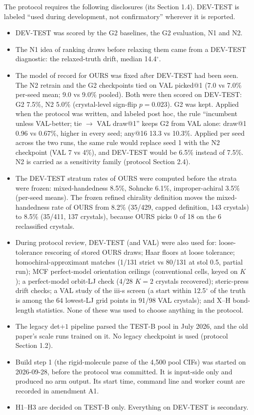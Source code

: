 The protocol requires the following disclosures (its Section 1.4). DEV-TEST is
labeled ``used during development, not confirmatory'' wherever it is reported.
\begin{itemize}
\item[(a)] DEV-TEST was scored by the G2 baselines, the G2 evaluation, N1 and N2.
\item[(b)] The N1 idea of ranking draws before relaxing them came from a DEV-TEST
diagnostic: the relaxed-truth drift, median 14.4$^\circ$.
\item[(c)] The model of record for OURS was fixed after DEV-TEST had been seen. The
N2 retrain and the G2 checkpoints tied on VAL picked@1 (7.0 vs 7.0\% per-seed mean;
9.0 vs 9.0\% pooled). Both were then scored on DEV-TEST: G2 7.5\%, N2 5.0\%
(crystal-level sign-flip $p=0.023$). G2 was kept. Applied when the protocol was
written, and labeled post hoc, the rule ``incumbent unless VAL-better; tie
$\rightarrow$ VAL draw@1'' keeps G2 from VAL alone: draw@1 0.96 vs 0.67\%, higher
in every seed; any@16 13.3 vs 10.3\%. Applied per seed across the two runs, the
same rule would replace seed 1 with the N2 checkpoint (VAL 7 vs 4\%), and DEV-TEST
would be 6.5\% instead of 7.5\%. N2 is carried as a sensitivity family (protocol
Section 2.4).
\item[(d)] The DEV-TEST stratum rates of OURS were computed before the strata were
frozen: mixed-handedness 8.5\%, Sohncke 6.1\%, improper-achiral 3.5\% (per-seed
means). The frozen refined chirality definition moves the mixed-handedness rate of
OURS from 8.2\% (35/429, capped definition, 143 crystals) to 8.5\% (35/411, 137
crystals), because OURS picks 0 of 18 on the 6 reclassified crystals.
\item[(e)] During protocol review, DEV-TEST (and VAL) were also used for:
loose-tolerance rescoring of stored OURS draws; Haar floors at loose tolerance;
homochiral-approximant matches (1/131 strict vs 80/131 at stol 0.5, partial run);
MCF perfect-model orientation ceilings (conventional cells, keyed on $K$); a
perfect-model orbit-LJ check (4/28 $K=2$ crystals recovered); steric-press drift
checks; a VAL study of the iii-s screen (a start within 12.5$^\circ$ of the truth
is among the 64 lowest-LJ grid points in 91/98 VAL crystals); and X--H bond-length
statistics. None of these was used to choose anything in the protocol.
\item[(f)] The legacy det$+1$ pipeline parsed the TEST-B pool in July 2026, and the
old paper's scale runs trained on it. No legacy checkpoint is used (protocol
Section 1.2).
\item[(g)] Build step 1 (the rigid-molecule parse of the 4,500 pool CIFs) was
started on 2026-09-28, before the protocol was committed. It is input-side only
and produced no arm output. Its start time, command line and worker count are
recorded in amendment A1.
\item[(h)] H1--H3 are decided on TEST-B only. Everything on DEV-TEST is secondary.
\end{itemize}

